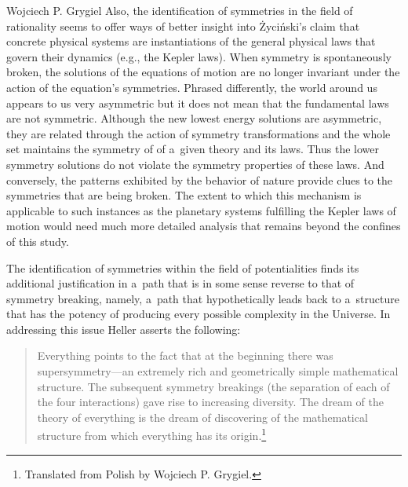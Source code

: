 \begin{artengenv}{Wojciech P. Grygiel}
Also, the identification of symmetries in the field of rationality seems to offer ways of better insight into Życiński's claim that concrete physical systems are instantiations of the general physical laws that govern their dynamics (e.g., the Kepler laws). When symmetry is spontaneously broken, the solutions of the equations of motion are no longer invariant under the action of the equation's symmetries. Phrased differently, the world around us appears to us very asymmetric but it does not mean that the fundamental laws are not symmetric. Although the new lowest energy solutions are asymmetric, they are related through the action of symmetry transformations and the whole set maintains the symmetry of of a~given theory and its laws. Thus the lower symmetry solutions do not violate the symmetry properties of these laws. And conversely, the patterns exhibited by the behavior of nature provide clues to the symmetries that are being broken. The extent to which this mechanism is applicable to such instances as the planetary systems fulfilling the Kepler laws of motion would need much more detailed analysis that remains beyond the confines of this study.



The identification of symmetries within the field of potentialities finds its additional justification in a~path that is in some sense reverse to that of symmetry breaking, namely, a~path that hypothetically leads back to a~structure that has the potency of producing every possible complexity in the Universe. In addressing this issue Heller 
\parencite*[][p.232]{heller_uchwycic_1997} %
 asserts the following:



\begin{quote}
Everything points to the fact that at the beginning there was supersymmetry---an extremely rich and geometrically simple mathematical structure. The subsequent symmetry breakings (the separation of each of the four interactions) gave rise to increasing diversity. The dream of the theory of everything is the dream of discovering of the mathematical structure from which everything has its origin.\footnote{Translated from Polish by Wojciech P. Grygiel.}
\end{quote}




\end{artengenv}
